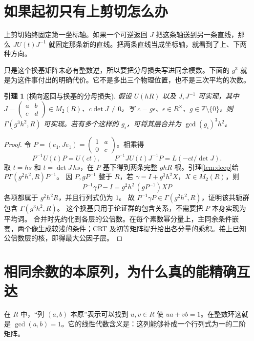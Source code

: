 \documentclass[11pt,a4paper,oneside,openany]{book}
\newcommand{\Z}{\mathbb Z}
\newtheorem{lemma}[theorem]{引理}
\theoremstyle{definition}
\numberwithin{equation}{chapter}
\begin{document}
\section{如果起初只有上剪切怎么办}
上剪切始终固定第一坐标轴。如果一个可逆返回 $J$ 把这条轴送到另一条直线，那么 $JU(t)J^{-1}$ 就固定那条新的直线。把两条直线当成坐标轴，就看到了上、下两种方向。

只是这个换基矩阵未必有整数逆，所以要把分母损失写进同余模数。下面的 $g^3$ 就是为这件事付出的明确代价。它不是多出三个物理位置，也不是三次平均的次数。
\begin{lemma}[横向返回与换基的分母损失]\label{lem:transverse}
假设 $U(hR)$ 以及 $J,J^{-1}$ 可实现，其中 $J=\left(\begin{smallmatrix}a&b\\c&d\end{smallmatrix}\right)\in M_2(R)$、$c\det J\ne0$。写 $c=g\epsilon$、$\epsilon\in R^\times$、$g\in\Z\setminus\{0\}$。则 $\Gamma(g^3h^2,R)$ 可实现。若有多个这样的 $g_i$，可将其层合并为 $\gcd(g_i)^3h^2$。
\end{lemma}
\begin{proof}
令 $P=(e_1,Je_1)=\left(\begin{smallmatrix}1&a\\0&c\end{smallmatrix}\right)$。相乘得
\[
P^{-1}U(t)P=U(ct),\qquad
P^{-1}JU(t)J^{-1}P=L(-ct/\det J).
\]
取 $t=hs$ 和 $t=\det J\,hs$，在 $P$ 基下得到两条完整 $ghR$ 根。引理\ref{lem:deep}给 $P\Gamma(g^2h^2,R)P^{-1}$。
因 $P,gP^{-1}$ 整于 $R$，若 $\gamma=I+g^3h^2X$，$X\in M_2(R)$，则
\[
P^{-1}\gamma P-I
=g^2h^2\,(gP^{-1})XP
\]
各项都属于 $g^2h^2R$，并且行列式仍为 $1$。
故 $P^{-1}\gamma P\in\Gamma(g^2h^2,R)$，证明该共轭群包含 $\Gamma(g^3h^2,R)$。
这个换基只用于论证群的包含关系，不需要把 $P$ 本身实现为平均词。
合并时先约化到各层的公倍数。在每个素数幂分量上，主同余条件嵌套，两个像生成较浅的条件；CRT 及初等矩阵提升给出各分量的乘积。接上已知公倍数层的核，即得最大公因子层。
\end{proof}

\section{相同余数的本原列，为什么真的能精确互达}
在 $R$ 中，“列 $(a,b)$ 本原”表示可以找到 $u,v\in R$ 使 $ua+vb=1$。在整数环这就是 $\gcd(a,b)=1$。它的线性代数含义是：这列能够补成一个行列式为一的二阶矩阵。
\end{document}
